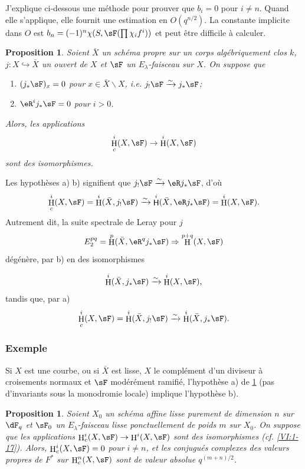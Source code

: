 \documentclass[oneside]{book}
\DeclareMathOperator{\h}{H}
\DeclareMathOperator{\hh}{\mathsf{H}} %
\newcommand{\iso}{\xrightarrow\sim}
\renewcommand{\setminus}{\smallsetminus}
\theoremstyle{sga-source}
\theoremstyle{sga-source-dash}
\theoremstyle{sga-source-dotdash}
\theoremstyle{sga-source-number-note-dash}
\theoremstyle{sga-source-note-number-dotdash}
\theoremstyle{sga-source-example-dotdash}
\theoremstyle{sga-source-inline-number}
\theoremstyle{sga-source-bare-number}
\theoremstyle{sga-source}
\newtheorem{proposition_}[subsection]{Proposition}
\newcommand{\PrintPage}[1]{}\newcommand{\MathPage}[1]{}\newcommand{\PrintCite}[2]{#1}\newcommand{\var}[3]{#1}
\begin{document}
J'explique ci-dessous une méthode pour prouver que $b_i=0$ pour $i\ne n$. 
Quand elle s'applique, elle fournit une estimation en $O(q^{n/2})$. La constante 
implicite dans $O$ est $b_n=(-1)^n \chi(S,\sF(\prod \chi_i f^i))$ et peut 
être difficile à calculer. 





\begin{proposition_}\label{VI:1-19}
Soient $\bar X$ un schéma propre sur un corps alg\'ebriquement clos $k$, 
$j:X\hookrightarrow \bar X$ \var{un ouvert de $X$}{un ouvert de $\bar X$}{S45-SOL-0719} et $\sF$ un $E_\lambda$-faisceau 
sur $X$. On suppose que 
\begin{enumerate}[\indent a)]
  \item $(j_\ast\sF)_x = 0$ pour $x\in \bar X\setminus X$, i.e. 
    $j_!\sF\iso j_\ast\sF$; 
  \item $\eR^i j_\ast \sF = 0$ pour $i>0$.
\end{enumerate}
Alors, les applications 
\[
  \h_c^i(X,\sF) \to \h^i(X,\sF)
\]
sont des isomorphismes. 
\end{proposition_}

Les hypothèses a) b) signifient que $j_! \sF \iso \eR j_\ast \sF$, d'où 
\[
  \h_c^i(X,\sF) = \h^i(\bar X,j_!\sF) \iso \hh^i(\bar X,\eR j_\ast \sF) = \h^i(X,\sF) \text{.}
\]
Autrement dit, la suite spectrale de Leray pour $j$ 
\[
  E_2^{pq} = \h^p(\bar X,\eR^q j_\ast \sF) \Rightarrow \h^{p+q}(X,\sF) 
\]
dégénère, par b) en des isomorphismes 
\PrintPage{180}
\[
  \h^i(\bar X,j_\ast\sF) \iso \h^i(X,\sF) \text{,}
\]
tandis que, par a) 
\[
  \h_c^i(X,\sF) = \h^i(\bar X,j_!\sF) \iso \h^i(\bar X,j_\ast\sF) \text{.}
\]





\subsubsection{Exemple}\label{VI:1-19-1}

Si $X$ est une courbe, ou si $\bar X$ est lisse, $X$ le complément d'un 
diviseur à croisements normaux et $\sF$ modérément ramifié, 
l'hypothèse a) de \ref{VI:1-19} (pas d'invariants sous la monodromie locale) 
implique l'hypothèse b). 





\begin{proposition_}\label{VI:1-20}
Soient $X_0$ un schéma affine lisse purement de dimension $n$ sur $\dF_q$ et 
$\sF_0$ un $E_\lambda$-faisceau lisse ponctuellement de poids $m$ sur $X_0$. On 
suppose que les applications $\h_c^i(X,\sF) \to \h^i(X,\sF)$ sont des 
isomorphismes \var{(cf. \ref{VI:1-17})}{(cf. \ref{VI:1-19})}{S45-SOL-0721}. Alors, $\h_c^i(X,\sF) = 0$ pour $i\ne n$, et 
les conjugués complexes des valeurs propres de $F^\ast$ sur $\h_c^n(X,\sF)$ 
sont de valeur absolue $q^{(m+n)/2}$. 
\end{proposition_}
\end{document}
